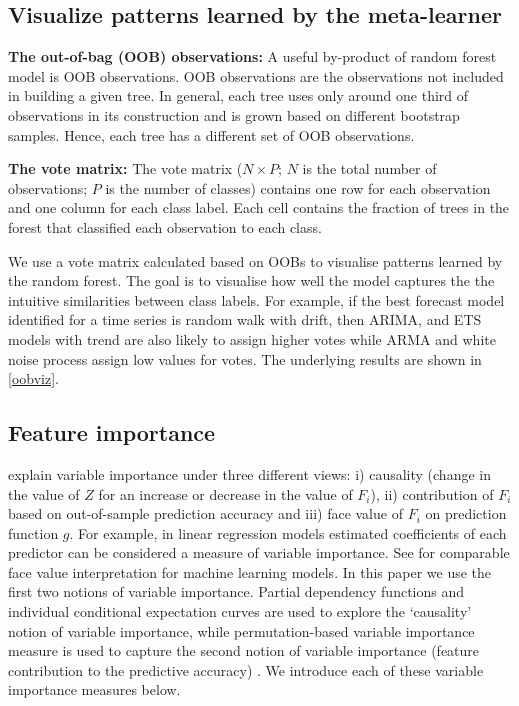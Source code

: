 \documentclass[11pt,a4paper,]{article}
\begin{document}
\hypertarget{visualize-patterns-learned-by-the-meta-learner}{%
\subsection{Visualize patterns learned by the meta-learner}\label{visualize-patterns-learned-by-the-meta-learner}}

\textbf{The out-of-bag (OOB) observations:} A useful by-product of random forest model is OOB observations. OOB observations are the observations not included in building a given tree. In general, each tree uses only around one third of observations in its construction and is grown based on different bootstrap samples. Hence, each tree has a different set of OOB observations.

\textbf{The vote matrix:} The vote matrix (\(N \times P\); \(N\) is the total number of observations; \(P\) is the number of classes) contains one row for each observation and one column for each class label. Each cell contains the fraction of trees in the forest that classified each observation to each class.

We use a vote matrix calculated based on OOBs to visualise patterns learned by the random forest. The goal is to visualise how well the model captures the the intuitive similarities between class labels. For example, if the best forecast model identified for a time series is random walk with drift, then ARIMA, and ETS models with trend are also likely to assign higher votes while ARMA and white noise process assign low values for votes. The underlying results are shown in \autoref{oobviz}.

\hypertarget{feature-importance}{%
\subsection{Feature importance}\label{feature-importance}}

\textcite{jiang2002} explain variable importance under three different views: i) causality (change in the value of \(Z\) for an increase or decrease in the value of \(F_i\)), ii) contribution of \(F_i\) based on out-of-sample prediction accuracy and iii) face value of \(F_i\) on prediction function \(g\). For example, in linear regression models estimated coefficients of each predictor can be considered a measure of variable importance. See \textcite{jiang2002} for comparable face value interpretation for machine learning models. In this paper we use the first two notions of variable importance. Partial dependency functions and individual conditional expectation curves are used to explore the `causality' notion of variable importance, while permutation-based variable importance measure is used to capture the second notion of variable importance (feature contribution to the predictive accuracy) \autocite{zhao2019causal}. We introduce each of these variable importance measures below.
\end{document}
